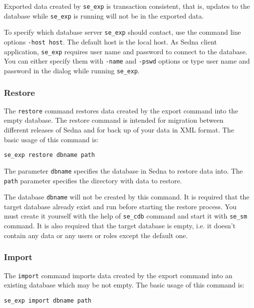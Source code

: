 \documentclass[a4paper,12pt]{article}
\begin{document}
Exported data created by \verb!se_exp! is transaction consistent, that is, updates to the database 
while \verb!se_exp! is running will not be in the exported data. 

To specify which database server \verb!se_exp! should contact, use the command line options 
\verb!-host host!. The default host is the local host. As Sedna client application, \verb!se_exp! 
requires user name and password to connect to the database. You can either specify them with 
\verb!-name! and \verb!-pswd! options or type user name and password in the dialog while 
running \verb!se_exp!.




\subsubsection*{Restore}

The \verb!restore! command restores data created by the export command into the empty database.
The restore command is intended for migration between different releases of Sedna and for back
up of your data in XML format. The basic usage of this command is:

\begin{verbatim}
se_exp restore dbname path
\end{verbatim}  

The parameter \verb!dbname! specifies the database in Sedna to restore data into. The \verb!path!
parameter specifies the directory with data to restore. 

The database \verb!dbname! will not be created by this command. It is required that the target database 
already exist and run before starting the restore process. You must create it yourself with the help
of \verb!se_cdb! command and start it with \verb!se_sm! command. It is also required that the target 
database is empty, i.e. it doesn't contain any data or any users or roles except the default one.




\subsubsection*{Import}

The \verb!import! command imports data created by the export command into an existing database
which may be not empty. The basic usage of this command is:

\begin{verbatim}
se_exp import dbname path
\end{verbatim}  
\end{document}
